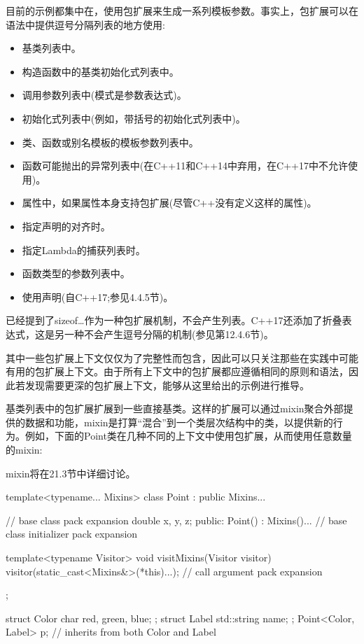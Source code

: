 目前的示例都集中在，使用包扩展来生成一系列模板参数。事实上，包扩展可以在语法中提供逗号分隔列表的地方使用:

\begin{itemize}
\item 
基类列表中。

\item 
构造函数中的基类初始化式列表中。

\item 
调用参数列表中(模式是参数表达式)。

\item 
初始化式列表中(例如，带括号的初始化式列表中)。

\item 
类、函数或别名模板的模板参数列表中。

\item 
函数可能抛出的异常列表中(在C++11和C++14中弃用，在C++17中不允许使用)。

\item 
属性中，如果属性本身支持包扩展(尽管C++没有定义这样的属性)。

\item 
指定声明的对齐时。

\item 
指定Lambda的捕获列表时。

\item 
函数类型的参数列表中。

\item 
使用声明(自C++17;参见4.4.5节)。
\end{itemize}

已经提到了sizeof…作为一种包扩展机制，不会产生列表。C++17还添加了折叠表达式，这是另一种不会产生逗号分隔的机制(参见第12.4.6节)。

其中一些包扩展上下文仅仅为了完整性而包含，因此可以只关注那些在实践中可能有用的包扩展上下文。由于所有上下文中的包扩展都应遵循相同的原则和语法，因此若发现需要更深的包扩展上下文，能够从这里给出的示例进行推导。

基类列表中的包扩展扩展到一些直接基类。这样的扩展可以通过mixin聚合外部提供的数据和功能，mixin是打算“混合”到一个类层次结构中的类，以提供新的行为。例如，下面的Point类在几种不同的上下文中使用包扩展，从而使用任意数量的mixin:

\begin{notice}
mixin将在21.3节中详细讨论。
\end{notice}

\begin{cpp}
template<typename... Mixins>
class Point : public Mixins... { // base class pack expansion
	double x, y, z;
public:
	Point() : Mixins()... { } // base class initializer pack expansion
	
	template<typename Visitor>
	void visitMixins(Visitor visitor) {
		visitor(static_cast<Mixins&>(*this)...); // call argument pack expansion
	}
};

struct Color { char red, green, blue; };
struct Label { std::string name; };
Point<Color, Label> p; // inherits from both Color and Label
\end{cpp}


